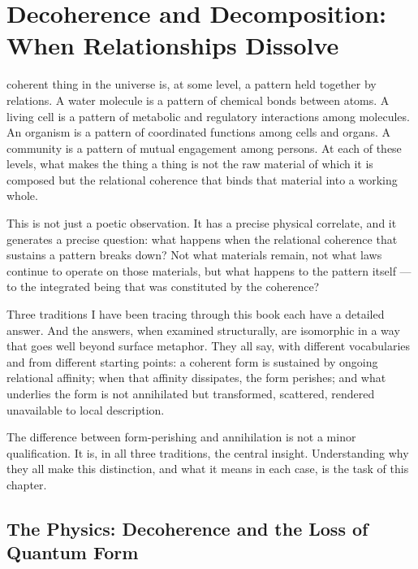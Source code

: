 \chapter[Decoherence and Decomposition]{Decoherence and Decomposition: When Relationships Dissolve}
\label{ch:decoherence-decomposition}


 coherent thing in the universe is, at some level, a pattern held together by relations.
A water molecule is a pattern of chemical bonds between atoms.
A living cell is a pattern of metabolic and regulatory interactions among molecules.
An organism is a pattern of coordinated functions among cells and organs.
A community is a pattern of mutual engagement among persons.
At each of these levels, what makes the thing a thing is not the raw material of which it is composed but the relational coherence that binds that material into a working whole.

This is not just a poetic observation.
It has a precise physical correlate, and it generates a precise question: what happens when the relational coherence that sustains a pattern breaks down?
Not what materials remain, not what laws continue to operate on those materials, but what happens to the pattern itself --- to the integrated being that was constituted by the coherence?

Three traditions I have been tracing through this book each have a detailed answer.
And the answers, when examined structurally, are isomorphic in a way that goes well beyond surface metaphor.
They all say, with different vocabularies and from different starting points: a coherent form is sustained by ongoing relational affinity; when that affinity dissipates, the form perishes; and what underlies the form is not annihilated but transformed, scattered, rendered unavailable to local description.

The difference between form-perishing and annihilation is not a minor qualification.
It is, in all three traditions, the central insight.
Understanding why they all make this distinction, and what it means in each case, is the task of this chapter.

\section{The Physics: Decoherence and the Loss of Quantum Form}
\label{sec:ch10-physics}

